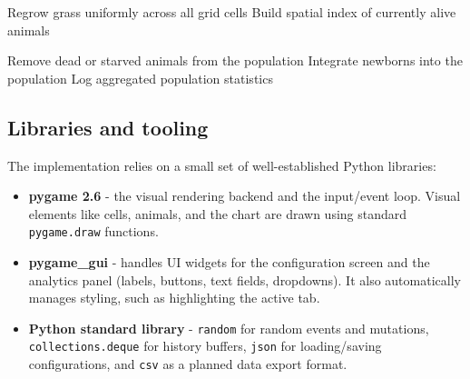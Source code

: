 \documentclass[english]{projectreport}
\begin{document}
\begin{algorithm}[H]
\BlankLine

Regrow grass uniformly across all grid cells\;
Build spatial index of currently alive animals\;


Remove dead or starved animals from the population\;
Integrate newborns into the population\;
Log aggregated population statistics\;

\caption{Description of a single simulation step.}
\label{alg:step}
\end{algorithm}



\subsection{Libraries and tooling}
\label{sec:tooling}

The implementation relies on a small set of well-established Python libraries:
\begin{itemize}
    \item \textbf{pygame 2.6} - the visual rendering backend and the input/event loop. Visual elements like cells, animals, and the chart are drawn using standard \texttt{pygame.draw} functions.
    \item \textbf{pygame\_gui} - handles UI widgets for the configuration screen and the analytics panel (labels, buttons, text fields, dropdowns). It also automatically manages styling, such as highlighting the active tab.
    \item \textbf{Python standard library} - \texttt{random} for random events and mutations, \\ \texttt{collections.deque} for history buffers, \texttt{json} for loading/saving configurations, and \texttt{csv} as a planned data export format.
\end{itemize}
\end{document}
